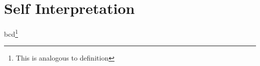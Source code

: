 \section{Self Interpretation} %
\label{sec:self}
bcd\footnote{This is analogous to \cite{jones} definition}
